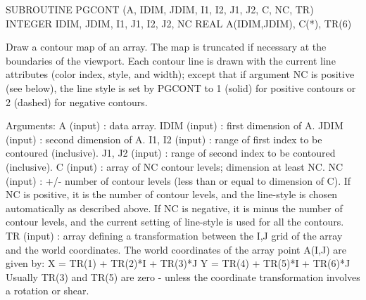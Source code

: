 {\eightpoint\begintt
      SUBROUTINE PGCONT (A, IDIM, JDIM, I1, I2, J1, J2, C, NC, TR)
      INTEGER IDIM, JDIM, I1, J1, I2, J2, NC
      REAL A(IDIM,JDIM), C(*), TR(6)
 
Draw a contour map of an array.  The map is truncated if
necessary at the boundaries of the viewport.  Each contour line
is drawn with the current line attributes (color index, style, and
width); except that if argument NC is positive (see below), the line
style is set by PGCONT to 1 (solid) for positive contours or 2
(dashed) for negative contours.
 
Arguments:
 A      (input) : data array.
 IDIM   (input) : first dimension of A.
 JDIM   (input) : second dimension of A.
 I1, I2 (input) : range of first index to be contoured (inclusive).
 J1, J2 (input) : range of second index to be contoured (inclusive).
 C      (input) : array of NC contour levels; dimension at least NC.
 NC     (input) : +/- number of contour levels (less than or equal
                  to dimension of C). If NC is positive, it is the
                  number of contour levels, and the line-style is
                  chosen automatically as described above. If NC is
                  negative, it is minus the number of contour
                  levels, and the current setting of line-style is
                  used for all the contours.
 TR     (input) : array defining a transformation between the I,J
                  grid of the array and the world coordinates.
                  The world coordinates of the array point A(I,J)
                  are given by:
                    X = TR(1) + TR(2)*I + TR(3)*J
                    Y = TR(4) + TR(5)*I + TR(6)*J
                  Usually TR(3) and TR(5) are zero - unless the
                  coordinate transformation involves a rotation or
                  shear.
\endtt}

